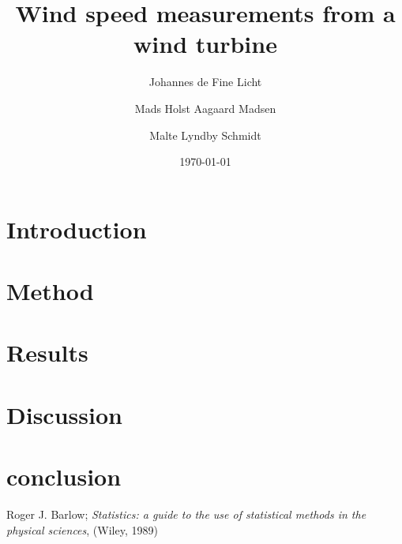 \documentclass[a4paper,%
               reprint,%
               aps,%
               prl,%
               amsfonts,%
               amssymb,%
               amsmath,%
               twoside,%
               balancelastpage,%
               eqsecnum]%
               {revtex4-1}
\begin{document}

\title{Wind speed measurements from a wind turbine}
\date{\today}                                                 %
\author{Johannes de Fine Licht}                                    %
\author{Mads Holst Aagaard Madsen}  
\author{Malte Lyndby Schmidt}       

\begin{abstract}                                              

\end{abstract}

\maketitle                                                    %

\section{Introduction}
\label{sec:introduction}


\section{Method}
\label{sec:method}


\section{Results}
\label{sec:results}


\section{Discussion}
\label{sec:discussion}


\section{conclusion}
\label{sec:conclusion}



\begin{thebibliography}{99}                                   

   Roger J. Barlow; \emph{Statistics: a guide to the use of
     statistical methods in the physical sciences}, (Wiley, 1989) 


\end{thebibliography}
\end{document}

